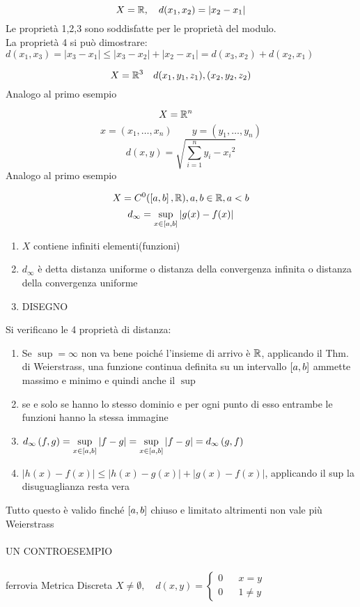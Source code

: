 \example
$$X=\bbset{R},\quad d(x_1,x_2)=\left| x_2-x_1 \right|$$
Le  proprietà 1,2,3 sono soddisfatte per le proprietà del modulo.\\
La proprietà 4 si può dimostrare: $d(x_1,x_3)=\left|x_3-x_1\right|\le\left|x_3-x_2\right|+\left|x_2-x_1\right|=d(x_3,x_2)+d(x_2,x_1)$

\example
$$X=\bbsetn{R}{3}\quad d({x_1,y_1,z_1),(x_2,y_2,z_2)}$$
Analogo al primo esempio

\example
$$X=\bbsetn{R}{n}\quad$$
$$x=(x_1,\ldots,x_n) \quad\quad y=(y_1,\ldots,y_n)$$
$$d(x,y)=\sqrt{\sum\limits_{i=1}^{n}{y_i-x_i}^2}$$
Analogo al primo esempio

\example
$$X=C^0(\realintervalclose{a}{b},\bbset{R}),a,b\in\bbset{R}, a<b$$
$$d_\infty=\sup\limits_{x\in\realintervalclose{a}{b}}\left|g(x)-f(x)\right|$$
\begin{enumerate}
	\item $X$ contiene infiniti elementi(funzioni)
	\item $d_\infty$ è detta distanza uniforme o distanza della convergenza infinita o distanza della convergenza uniforme
	\item DISEGNO
\end{enumerate}
Si verificano le 4 proprietà di distanza:
\begin{enumerate}
	\item Se $\sup = \infty$ non va bene poiché l'insieme di arrivo è $\bbset{R}$, applicando il Thm. di Weierstrass, una funzione continua definita su un intervallo $\realintervalclose{a}{b}$ ammette massimo e minimo e quindi anche il $\sup$
	\item se e solo se hanno lo stesso dominio e per ogni punto di esso entrambe le funzioni hanno la stessa immagine
	\item $\dinfty{f}{g}=\ddinfty{f}{g}{\realintervalclose{a}{b}}=\ddinfty{g}{f}{\realintervalclose{a}{b}}=\dinfty{g}{f}$
	\item $\left| h(x)-f(x) \right|\le\left|h(x)-g(x)\right|+\left|g(x)-f(x)\right| $, applicando il sup la disuguaglianza resta vera
\end{enumerate}
\observation 
Tutto questo è valido finché $\realintervalclose{a}{b}$ chiuso e limitato altrimenti non vale più Weierstrass \\
\\
UN CONTROESEMPIO\\
\\
\example
ferrovia
\example
Metrica Discreta
$X\ne \emptyset,\quad d(x,y)= \left\{\begin{matrix}0&&x=y\\0&&1\ne y\end{matrix}\right.$
